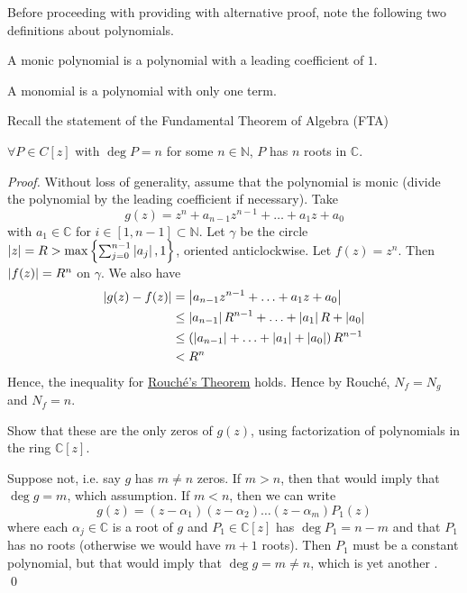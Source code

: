 \documentclass[notoc,notitlepage]{tufte-book}
\begin{document}
Before proceeding with providing with alternative proof, note the following two definitions about polynomials.

\begin{defn}\label{defn:monic_polynomial}
  A monic polynomial is a polynomial with a leading coefficient of $1$.
\end{defn}

\begin{defn}\label{defn:monomial}
  A monomial is a polynomial with only one term.
\end{defn}

Recall the statement of the Fundamental Theorem of Algebra (FTA)

$\forall P \in C[z]$ with $\deg P = n$ for some $n \in \mathbb{N}$, $P$ has $n$ roots in $\mathbb{C}$.

\begin{proof}
  Without loss of generality, assume that the polynomial is monic (divide the polynomial by the leading coefficient if necessary). Take
  \begin{equation*}
    g(z) = z^n + a_{n - 1}z^{n - 1} + \hdots + a_1 z + a_0
  \end{equation*}
  with $a_1 \in \mathbb{C}$ for $i \in [1, n - 1] \subset \mathbb{N}$. Let $\gamma$ be the circle $\left|z\right| = R > \max\left\{\sum_{j=0}^{n-1} \left|a_j\right|, 1 \right\}$, oriented anticlockwise. Let $f(z) = z^n$. Then $\left|f(z)\right| = R^n$ on $\gamma$. We also have
  \begin{align*}
    \left|g(z) - f(z)\right|
      &= \left|a_{n - 1} z^{n - 1} + \hdots + a_1 z + a_0\right| \\
      &\leq \left|a_{n-1}\right| R^{n - 1} + \hdots + \left|a_1\right| R + \left|a_0\right| \\
      &\leq \left( \left|a_{n-1}\right| + \hdots + \left|a_1\right| + \left|a_0\right| \right) R^{n - 1} \\
      &< R^n
  \end{align*}
  Hence, the inequality for \hyperref[thm:rouche_s_theorem]{Rouch\'e's Theorem} holds. Hence by Rouch\'e, $N_f = N_g$ and $N_f = n$.

  \textit{} Show that these are the only zeros of $g(z)$, using factorization of polynomials in the ring $\mathbb{C}[z]$.

  Suppose not, i.e. say $g$ has $m \neq n$ zeros. If $m > n$, then that would imply that $\deg g = m$, which \Lightning assumption. If $m < n$, then we can write
  \begin{equation*}
    g(z) = (z - \alpha_1)(z - \alpha_2) \hdots (z - \alpha_m) P_1(z)
  \end{equation*}
  where each $\alpha_j \in \mathbb{C}$ is a root of $g$ and $P_1 \in \mathbb{C} [z]$ has $\deg P_1 = n - m$ and that $P_1$ has no roots (otherwise we would have $m + 1$ roots). Then $P_1$ must be a constant polynomial, but that would imply that $\deg g = m \neq n$, which is yet another \Lightning. \qed
\end{proof}
\end{document}
